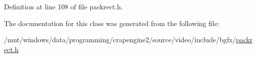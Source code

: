 Definition at line 108 of file packrect.\+h.



The documentation for this class was generated from the following file\+:\begin{DoxyCompactItemize}
\item 
/mnt/windows/data/programming/crapengine2/source/video/include/bgfx/\hyperlink{packrect_8h}{packrect.\+h}\end{DoxyCompactItemize}

